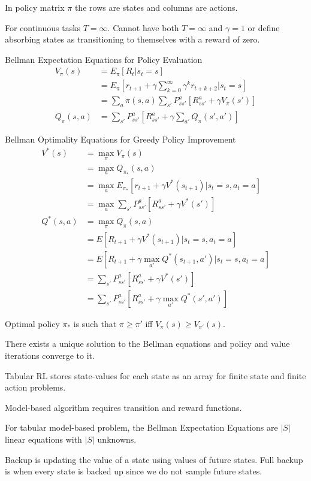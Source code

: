 \documentclass[twocolumn]{article}
\begin{document}
In policy matrix $\pi$ the rows are states and columns are actions.

For continuous tasks $T=\infty$. Cannot have both $T=\infty$ and $\gamma=1$ or define absorbing states as transitioning to themselves with a reward of zero.

Bellman Expectation Equations for Policy Evaluation
\begin{align*}
V_\pi(s)&=E_\pi[R_t|s_t=s] \\
&=E_\pi[r_{t+1}+\gamma\sum_{k=0}^\infty\gamma^k r_{t+k+2}|s_t=s] \\
&=\sum_a\pi(s,a)\sum_{s'}P^a_{ss'}[R^a_{ss'}+\gamma V_\pi(s')] \\
Q_\pi(s,a)&=\sum_{s'}P^a_{ss'}[R^a_{ss'}+\gamma\sum_{a'}Q_\pi(s',a')]
\end{align*}

Bellman Optimality Equations for Greedy Policy Improvement
\begin{align*}
V^*(s)&=\max_\pi V_\pi(s) \\
&=\max_a Q_{\pi_*}(s,a) \\
&=\max_a E_{\pi_*}[r_{t+1}+\gamma V^*(s_{t+1})|s_t=s,a_t=a] \\
&=\max_a \sum_{s'} P^a_{ss'}[R^a_{ss'}+\gamma V^*(s')] \\
Q^*(s,a)&=\max_\pi Q_\pi(s,a) \\
&=E[R_{t+1}+\gamma V^*(s_{t+1})|s_t=s,a_t=a] \\
&=E[R_{t+1}+\gamma\max_{a'}Q^*(s_{t+1},a')|s_t=s,a_t=a] \\
&=\sum_{s'}P^a_{ss'}[R^a_{ss'}+\gamma V^*(s')] \\
&=\sum_{s'}P^a_{ss'}[R^a_{ss'}+\gamma\max_{a'}Q^*(s',a')]
\end{align*}

Optimal policy $\pi_*$ is such that $\pi\ge\pi'$ iff $V_\pi(s)\ge V_{\pi'}(s)$.

There exists a unique solution to the Bellman equations and policy and value iterations converge to it.

Tabular RL stores state-values for each state as an array for finite state and finite action problems.

Model-based algorithm requires transition and reward functions.

For tabular model-based problem, the Bellman Expectation Equations are $|S|$ linear equations with $|S|$ unknowns. 

Backup is updating the value of a state using values of future states. Full backup is when every state is backed up since we do not sample future states.
\end{document}
